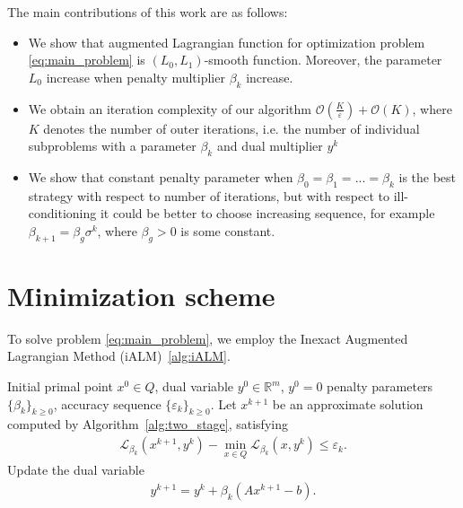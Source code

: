 \documentclass[runningheads]{llncs}
\begin{document}
	The main contributions of this work are as follows:
	\begin{itemize}
		\item We show that augmented Lagrangian function for optimization problem \eqref{eq:main_problem} is $(L_0,L_1)$-smooth function. Moreover, the parameter $L_0$ increase when penalty multiplier $\beta_k$ increase.
		\item We obtain an iteration complexity of our algorithm $\mathcal{O}(\frac{K}{\varepsilon}) + \mathcal{O}(K)$, where $K$ denotes the number of outer iterations, i.e. the number of individual subproblems with a parameter $\beta_k$ and dual multiplier $y^k$
		\item We show that constant penalty parameter when $\beta_0 = \beta_1 = ... = \beta_k$ is the best strategy with respect to number of iterations, but with respect to ill-conditioning it could be better to choose increasing sequence, for example $\beta_{k+1} = \beta_g\sigma^k$, where $\beta_g > 0$ is some constant.
	\end{itemize}
	
	\section{Minimization scheme}
	
	To solve problem \eqref{eq:main_problem}, we employ the Inexact Augmented Lagrangian Method (iALM)~\ref{alg:iALM}.
	
	\begin{algorithm}[t]
		\caption{Inexact Augmented Lagrangian Method with a Two-Stage Acceleration Procedure for Solving Subproblems}
		\label{alg:iALM}
		\begin{algorithmic}[1]
			\Require Initial primal point $x^0 \in Q$, dual variable $y^0 \in \mathbb{R}^m$, $y^0 = 0$ penalty parameters $\{\beta_k\}_{k \geq 0}$, accuracy sequence $\{\varepsilon_k\}_{k \geq 0}$.
			\State Let $x^{k+1}$ be an approximate solution computed by Algorithm~\ref{alg:two_stage}, satisfying
			\begin{align*}
				\mathcal{L}_{\beta_k}(x^{k+1},y^k)
				-
				\min_{x\in Q}
				\mathcal{L}_{\beta_k}(x,y^k)
				\leq
				\varepsilon_k .
			\end{align*}
			\State Update the dual variable
			\begin{align*}
				y^{k+1}
				=
				y^k+\beta_k(Ax^{k+1}-b).
			\end{align*}
			\EndFor
		\end{algorithmic}
	\end{algorithm}
	
\end{document}

